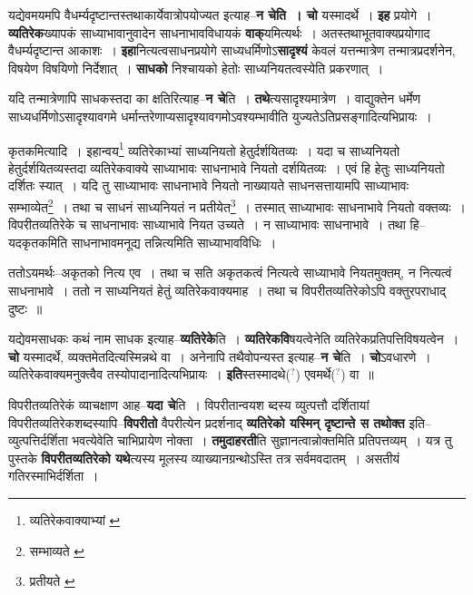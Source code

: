 \documentclass[article,12pt,a4paper]{memoir}
\newcommand{\unclear}[1]{($^{?}$#1)}
\begin{document}
	  \pstart यद्येवमयमपि वैधर्म्यदृष्टान्तस्तथाकार्येवात्रोपयोज्यत इत्याह--\textbf{न चेति । चो} यस्मादर्थे । \textbf{इह} प्रयोगे । \textbf{व्यतिरेक}ख्यापकं साध्याभावानुवादेन साधनाभावविधायकं \textbf{वाक्}यमित्यर्थः । अतस्तथाभूतवाक्यप्रयोगाद वैधर्म्यदृष्टान्त आकाशः । \textbf{इहा}नित्यत्वसाधनप्रयोगे साध्यधर्मिणोऽ\textbf{सादृश्यं} केवलं यत्तन्मात्रेण तन्मात्रप्रदर्शनेन, विषयेण विषयिणो निर्देशात् । \textbf{साधको} निश्चायको हेतोः साध्यनियतत्वस्येति प्रकरणात् ।
	\pend
      

	  \pstart यदि तन्मात्रेणापि साधकस्तदा का क्षतिरित्याह--\textbf{न चे}ति । \textbf{तथे}त्यसादृश्यमात्रेण । वाद्युक्तेन धर्मेण साध्यधर्मिणोऽसादृश्यावगमे धर्मान्तरेणाप्यसादृश्यावगमोऽवश्यम्भावीति युज्यतेऽतिप्रसङ्गादित्यभिप्रायः ।
	\pend
	  \bigskip
	  \begingroup
	

	  \pstart कृतकमित्यादि । इहान्वय\footnote{व्यतिरेकवाक्याभ्यां \cite{dp-msA} \cite{dp-msB} \cite{dp-msD} \cite{dp-edP} \cite{dp-edH} \cite{dp-edE} \cite{dp-edN}} व्यतिरेकाभ्यां साध्यनियतो हेतुर्दर्शयितव्यः । यदा च साध्यनियतो हेतुर्दर्शयितव्यस्तदा व्यतिरेकवाक्ये साध्याभावः साधनाभावे नियतो दर्शयितव्यः । एवं हि हेतुः साध्यनियतो दर्शितः स्यात् । यदि तु साध्याभावः साधनाभावे नियतो नाख्यायते साधनसत्तायामपि साध्याभावः सम्भाव्येत\footnote{सम्भाव्यते \cite{dp-msB}} । तथा च साधनं साध्यनियतं न प्रतीयेत\footnote{प्रतीयते \cite{dp-msB} \cite{dp-msC}} । तस्मात् साध्याभावः साधनाभावे नियतो वक्तव्यः । विपरीतव्यतिरेके च साधनाभावः साध्याभावे नियत उच्यते । न साध्याभावः साधनाभावे । तथा हि--यदकृतकमिति साधनाभावमनूद्य तन्नित्यमिति साध्याभावविधिः ।
	\pend
       

	  \pstart ततोऽयमर्थः--अकृतको नित्य एव । तथा च सति अकृतकत्वं नित्यत्वे साध्याभावे नियतमुक्तम्, न नित्यत्वं साधनाभावे । ततो न साध्यनियतं हेतुं व्यतिरेकवाक्यमाह । तथा च विपरीतव्यतिरेकोऽपि वक्तुरपराधाद् दुष्टः ॥
	\pend
      
	  \endgroup
	

	  \pstart यद्येवमसाधकः कथं नाम साधक इत्याह--\textbf{व्यतिरेके}ति । \textbf{व्यतिरेकवि}षयत्वेनेति व्यतिरेकप्रतिपत्तिविषयत्वेन । \textbf{चो} यस्मादर्थे, व्यक्तमेतदित्यस्मिन्नथे वा । अनेनापि तथैवोपन्यस्त इत्याह--\textbf{न चे}ति । \textbf{चो}ऽवधारणे । व्यतिरेकवाक्यमनुक्त्वैव तस्योपादानादित्यभिप्रायः । \textbf{इति}स्तस्मादथे\unclear{} एवमर्थे\unclear{} वा ॥
	\pend
      

	  \pstart विपरीतव्यतिरेकं व्याचक्षाण आह--\textbf{यदा चे}ति । विपरीतान्वयश \leavevmode{} ब्दस्य व्युत्पत्तौ दर्शितायां विपरीतव्यतिरेकशब्दस्यापि--\textbf{विपरीतो} वैपरीत्येन प्रदर्शनाद् \textbf{व्यतिरेको यस्मिन् दृष्टान्ते स तथोक्त} इति--व्युत्पत्तिर्दर्शिता भवत्येवेति चाभिप्रायेण नोक्ता । \textbf{तमुदाहरती}ति सुज्ञानत्वान्नोक्तमिति प्रतिपत्तव्यम् । यत्र तु पुस्तके \textbf{विपरीतव्यतिरेको यथे}त्यस्य मूलस्य व्याख्यानग्रन्थोऽस्ति तत्र सर्वमवदातम् । असतीयं गतिरस्माभिर्दर्शिता ।
	\pend
      
\end{document}
